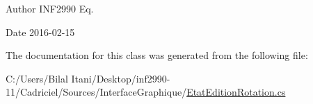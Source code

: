 \begin{DoxyAuthor}{Author}
I\+N\+F2990 Eq. 
\end{DoxyAuthor}
\begin{DoxyDate}{Date}
2016-\/02-\/15 
\end{DoxyDate}


The documentation for this class was generated from the following file\+:\begin{DoxyCompactItemize}
\item 
C\+:/\+Users/\+Bilal Itani/\+Desktop/inf2990-\/11/\+Cadriciel/\+Sources/\+Interface\+Graphique/\hyperlink{_etat_edition_rotation_8cs}{Etat\+Edition\+Rotation.\+cs}\end{DoxyCompactItemize}
